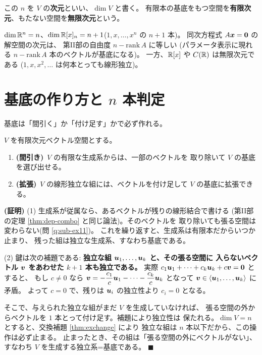\begin{teigi}[次元]
この $n$ を $V$ の\textbf{次元}といい、$\dim V$ と書く。
有限本の基底をもつ空間を\textbf{有限次元}、もたない空間を\textbf{無限次元}という。
\end{teigi}

\begin{rei}
$\dim \mathbb{R}^n = n$、$\dim \mathbb{R}[x]_n = n + 1$($1, x, \dots, x^n$ の $n+1$ 本)。
同次方程式 $A\bm{x} = \bm{0}$ の解空間の次元は、
第II部の自由度 $n - \mathrm{rank}\,A$ に等しい
(パラメータ表示に現れる $n - \mathrm{rank}\,A$ 本のベクトルが基底になる)。
一方、$\mathbb{R}[x]$ や $C(\mathbb{R})$ は無限次元である
($1, x, x^2, \dots$ は何本とっても線形独立)。
\end{rei}

\section{基底の作り方と $n$ 本判定}

基底は「間引く」か「付け足す」かで必ず作れる。

\begin{teiri}[間引きと拡張]\label{thm:dim-extend}
$V$ を有限次元ベクトル空間とする。
\begin{enumerate}
\item \textbf{(間引き)}\ $V$ の有限な生成系からは、一部のベクトルを
取り除いて $V$ の基底を選び出せる。
\item \textbf{(拡張)}\ $V$ の線形独立な組には、ベクトルを付け足して
$V$ の基底に拡張できる。
\end{enumerate}
\end{teiri}

\noindent\textbf{(証明)}\quad
(1) 生成系が従属なら、あるベクトルが残りの線形結合で書ける
(第II部の定理 \ref{thm:dep-combo} と同じ論法)。そのベクトルを
取り除いても張る空間は変わらない(問 \ref{q:sub-ex11})。
これを繰り返すと、生成系は有限本だからいつか止まり、
残った組は独立な生成系、すなわち基底である。

(2) 鍵は次の補題である:
\textbf{独立な組 $\bm{u}_1, \dots, \bm{u}_k$ と、その張る空間に
入らないベクトル $\bm{v}$ をあわせた $k + 1$ 本も独立である。}
実際 $c_1\bm{u}_1 + \cdots + c_k\bm{u}_k + c\bm{v} = \bm{0}$ とすると、
もし $c \neq 0$ なら $\bm{v} = -\dfrac{c_1}{c}\bm{u}_1 - \cdots
- \dfrac{c_k}{c}\bm{u}_k$ となって
$\bm{v} \in \langle \bm{u}_1, \dots, \bm{u}_k \rangle$ に矛盾。
よって $c = 0$ で、残りは $\bm{u}_i$ の独立性より $c_i = 0$ となる。

そこで、与えられた独立な組がまだ $V$ を生成していなければ、
張る空間の外からベクトルを $1$ 本とって付け足す。補題により独立性は
保たれる。$\dim V = n$ とすると、交換補題 \ref{thm:exchange} により
独立な組は $n$ 本以下だから、この操作は必ず止まる。
止まったとき、その組は「張る空間の外にベクトルがない」、
すなわち $V$ を生成する独立系=基底である。 $\blacksquare$

